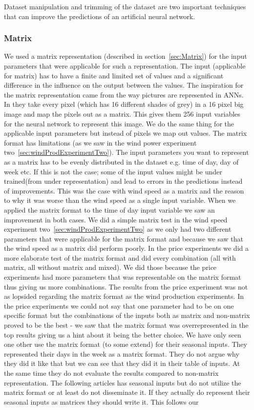 Dataset manipulation and trimming of the dataset are two important techniques that can improve the predictions of an artificial neural network.
\subsubsection{Matrix}
We used a matrix representation (described in section~\ref{sec:Matrix}) for the input parameters that were applicable for such a representation. The input (applicable for matrix) has to have a finite and limited set of values and a significant difference in the influence on the output between the values. The inspiration for the matrix representation came from the way pictures are represented in ANNs. In \cite{knerr1992handwritten} they take every pixel (which has 16 different shades of grey) in a 16 pixel big image and map the pixels out as a matrix. This gives them 256 input variables for the neural network to represent this image. We do the same thing for the applicable input parameters but instead of pixels we map out values. The matrix format has limitations (as we saw in the wind power experiment two~\ref{sec:windProdExperimentTwo}). The input parameters you want to represent as a matrix has to be evenly distributed in the dataset e.g. time of day, day of week etc. If this is not the case; some of the input values might be under trained(from under representation) and lead to errors in the predictions instead of improvements. This was the case with wind speed as a matrix and the reason to why it was worse than the wind speed as a single input variable. When we applied the matrix format to the time of day input variable we saw an improvement in both cases. We did a simple matrix test in the wind speed experiment two~\ref{sec:windProdExperimentTwo} as we only had two different parameters that were applicable for the matrix format and because we saw that the wind speed as a matrix did perform poorly. In the price experiments we did a more elaborate test of the matrix format and did every combination (all with matrix, all without matrix and mixed). We did those because the price experiments had more parameters that was representable on the matrix format thus giving us more combinations. The results from the price experiment was not as lopsided regarding the matrix format as the wind production experiments. In the price experiments we could not say that one parameter had to be on one specific format but the combinations of the inputs both as matrix and non-matrix proved to be the best - we saw that the matrix format was overrepresented in the top results giving us a hint about it being the better choice. We have only seen one other \cite{crowley2005weather} use the matrix format (to some extend) for their seasonal inputs. They represented their days in the week as a matrix format. They do not argue why they did it like that but we can see that they did it in their table of inputs. At the same time they do not evaluate the results compared to non-matrix representation. The following articles has seasonal inputs but do not utilize the matrix format \cite{szkuta1999electricity, singhal2011electricity} or at least do not disseminate it. If they actually do represent their seasonal inputs as matrices they should write it. This follows our 